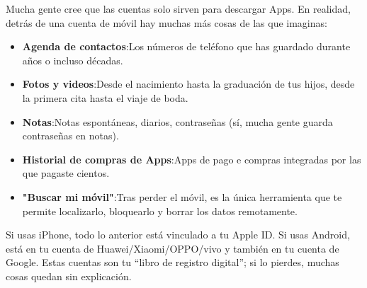


Mucha gente cree que las cuentas solo sirven para descargar Apps. En realidad, detrás de una cuenta de móvil hay muchas más cosas de las que imaginas:

\begin{itemize}
  \item \textbf{Agenda de contactos}:Los números de teléfono que has guardado durante años o incluso décadas.
  \item \textbf{Fotos y videos}:Desde el nacimiento hasta la graduación de tus hijos, desde la primera cita hasta el viaje de boda.
  \item \textbf{Notas}:Notas espontáneas, diarios, contraseñas (sí, mucha gente guarda contraseñas en notas).
  \item \textbf{Historial de compras de Apps}:Apps de pago e compras integradas por las que pagaste cientos.
  \item \textbf{"Buscar mi móvil"}:Tras perder el móvil, es la única herramienta que te permite localizarlo, bloquearlo y borrar los datos remotamente.
\end{itemize}

Si usas iPhone, todo lo anterior está vinculado a tu Apple ID. Si usas Android, está en tu cuenta de Huawei/Xiaomi/OPPO/vivo y también en tu cuenta de Google. Estas cuentas son tu “libro de registro digital”; si lo pierdes, muchas cosas quedan sin explicación.


